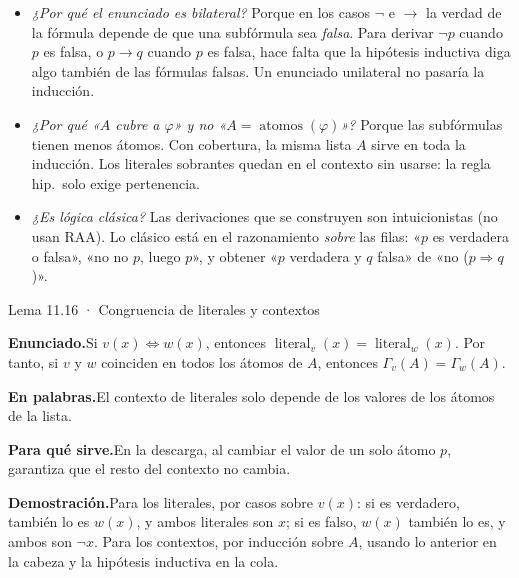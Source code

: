 \documentclass[11pt,a4paper]{article}
\newcommand{\campo}[1]{\par\smallskip\noindent\textbf{#1}\enspace}
\newcommand{\enunciado}{\campo{Enunciado.}}
\newcommand{\palabras}{\campo{En palabras.}}
\newcommand{\sirve}{\campo{Para qué sirve.}}
\newcommand{\prueba}{\campo{Demostración.}}
\newcommand{\Imp}{\rightarrow}
\newcommand{\Not}{\neg}
\newcommand{\atomos}{\operatorname{atomos}}
\newcommand{\lit}{\operatorname{literal}}
\begin{document}
\begin{trampa}
\begin{itemize}
  \item \emph{¿Por qué el enunciado es bilateral?} Porque en los casos
    \(\Not\) e \(\Imp\) la verdad de la fórmula depende de que una subfórmula
    sea \emph{falsa}. Para derivar \(\Not p\) cuando \(p\) es falsa, o
    \(p\Imp q\) cuando \(p\) es falsa, hace falta que la hipótesis inductiva
    diga algo también de las fórmulas falsas. Un enunciado unilateral no
    pasaría la inducción.
  \item \emph{¿Por qué «\(A\) cubre a \(\varphi\)» y no «\(A=\atomos(\varphi)\)»?}
    Porque las subfórmulas tienen menos átomos. Con cobertura, la misma lista
    \(A\) sirve en toda la inducción. Los literales sobrantes quedan en el
    contexto sin usarse: la regla hip.\ solo exige pertenencia.
  \item \emph{¿Es lógica clásica?} Las derivaciones que se construyen son
    intuicionistas (no usan RAA). Lo clásico está en el razonamiento
    \emph{sobre} las filas: «\(p\) es verdadera o falsa», «no no \(p\), luego
    \(p\)», y obtener «\(p\) verdadera y \(q\) falsa» de «no
    (\(p\Rightarrow q\))».
\end{itemize}
\end{trampa}

\begin{resultado}{Lema 11.16 · Congruencia de literales y contextos}
\enunciado Si \(v(x)\iff w(x)\), entonces \(\lit_v(x)=\lit_w(x)\). Por tanto,
si \(v\) y \(w\) coinciden en todos los átomos de \(A\), entonces
\(\Gamma_v(A)=\Gamma_w(A)\).

\palabras El contexto de literales solo depende de los valores de los átomos
de la lista.

\sirve En la descarga, al cambiar el valor de un solo átomo \(p\), garantiza
que el resto del contexto no cambia.

\prueba Para los literales, por casos sobre \(v(x)\): si es verdadero, también
lo es \(w(x)\), y ambos literales son \(x\); si es falso, \(w(x)\) también lo
es, y ambos son \(\Not x\). Para los contextos, por inducción sobre \(A\),
usando lo anterior en la cabeza y la hipótesis inductiva en la cola.
\end{resultado}
\end{document}
